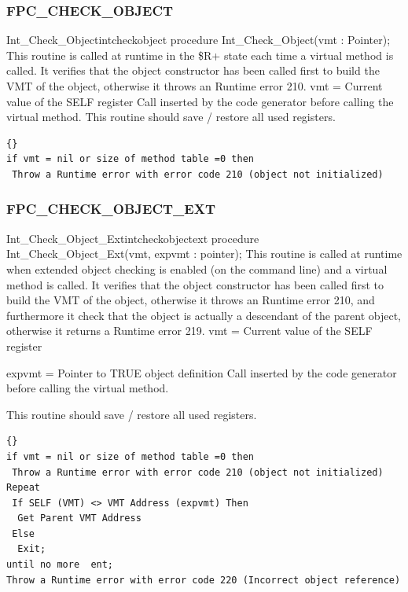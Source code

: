 \documentclass [a4paper,12pt]{article}
\begin{document}
\subsubsection{FPC{\_}CHECK{\_}OBJECT}
\label{subsubsec:mylabel55}

\begin{procedurel}{Int{\_}Check{\_}Object}{intcheckobject}
\Declaration
procedure Int{\_}Check{\_}Object(vmt : Pointer);
\Description
This routine is called at runtime in the {\$}R+ state each time a virtual
method is called. It verifies that the object constructor has been called
first to build the VMT of the object, otherwise it throws an Runtime error 210.
\Parameters
vmt = Current value of the SELF register
\Notes
Call inserted by the code generator before calling the virtual method. This
routine should save / restore all used registers.
\Algorithm
\begin{lstlisting}{}
if vmt = nil or size of method table =0 then
 Throw a Runtime error with error code 210 (object not initialized)
\end{lstlisting}
\end{procedurel}

\subsubsection{FPC{\_}CHECK{\_}OBJECT{\_}EXT}
\label{subsubsec:mylabel56}

\begin{procedurel}{Int{\_}Check{\_}Object{\_}Ext}{intcheckobjectext}
\Declaration
procedure Int{\_}Check{\_}Object{\_}Ext(vmt, expvmt : pointer);
\Description
This routine is called at runtime when extended object checking is enabled (on the command line) and a virtual method is called. It verifies that the object constructor has been called first to build the VMT of the object, otherwise it throws an Runtime error 210, and furthermore it check that the object is actually a descendant of the parent object, otherwise it returns a Runtime error 219.
\Parameters
vmt = Current value of the SELF register \par
expvmt = Pointer to TRUE object definition
\Notes
Call inserted by the code generator before calling the virtual method. \par
This routine should save / restore all used registers.
\Algorithm
\begin{lstlisting}{}
if vmt = nil or size of method table =0 then
 Throw a Runtime error with error code 210 (object not initialized)
Repeat
 If SELF (VMT) <> VMT Address (expvmt) Then
  Get Parent VMT Address
 Else
  Exit; 
until no more  ent; 
Throw a Runtime error with error code 220 (Incorrect object reference)
\end{lstlisting}
\end{procedurel}
\end{document}
